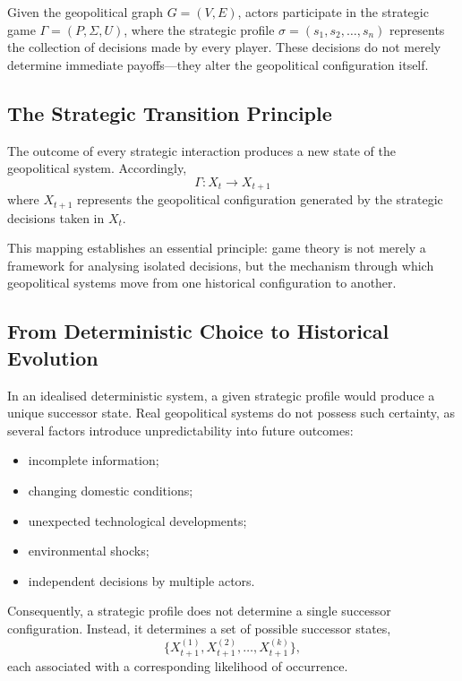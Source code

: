 \documentclass[11pt,openany]{book}
\theoremstyle{plain}
\theoremstyle{definition}
\begin{document}
Given the geopolitical graph \(G=(V,E)\), actors participate in the strategic game \(\Gamma=(P,\Sigma,U)\), where the strategic profile \(\sigma = (s_1,s_2,\ldots,s_n)\) represents the collection of decisions made by every player. These decisions do not merely determine immediate payoffs—they alter the geopolitical configuration itself.

\subsection*{The Strategic Transition Principle}

The outcome of every strategic interaction produces a new state of the geopolitical system. Accordingly,
\[
\boxed{
\Gamma : X_t \longrightarrow X_{t+1}
}
\]
where \(X_{t+1}\) represents the geopolitical configuration generated by the strategic decisions taken in \(X_t\).

This mapping establishes an essential principle: game theory is not merely a framework for analysing isolated decisions, but the mechanism through which geopolitical systems move from one historical configuration to another.

\subsection*{From Deterministic Choice to Historical Evolution}

In an idealised deterministic system, a given strategic profile would produce a unique successor state. Real geopolitical systems do not possess such certainty, as several factors introduce unpredictability into future outcomes:
\begin{itemize}
    \item incomplete information;
    \item changing domestic conditions;
    \item unexpected technological developments;
    \item environmental shocks;
    \item independent decisions by multiple actors.
\end{itemize}

Consequently, a strategic profile does not determine a single successor configuration. Instead, it determines a set of possible successor states,
\[
\{ X_{t+1}^{(1)}, X_{t+1}^{(2)}, \ldots, X_{t+1}^{(k)} \},
\]
each associated with a corresponding likelihood of occurrence.
\end{document}
